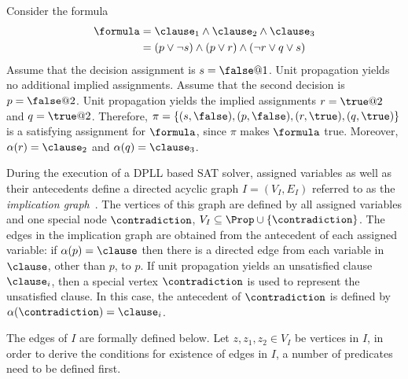 \begin{example}
    Consider the formula 
    \begin{align*}
        \formula & = \clause_1 \land \clause_2 \land \clause_3\\
                 & = (p \lor \neg s) \land (p \lor r) \land (\neg r \lor q \lor s)
    \end{align*}
    Assume that the decision assignment is $s = \false @ 1$. Unit propagation
    yields no additional implied assignments. Assume that the second decision is
    $p = \false @ 2$. Unit propagation yields the implied assignments $r = \true
    @ 2$ and $q = \true @ 2$. Therefore, $\pi = \{(s, \false), (p, \false), (r,
    \true), (q, \true)\}$ is a satisfying assignment for $\formula$, since $\pi$
    makes $\formula$ true. Moreover, $\alpha(r) = \clause_2$ and $\alpha(q) =
    \clause_3$.
\end{example}

During the execution of a DPLL based SAT solver, assigned variables as well as
their antecedents define a directed acyclic graph $I = (V_I, E_I)$ referred to as
the \emph{implication graph}~\cite{silva1997grasp}. The vertices of this graph
are defined by all assigned variables and one special node $\contradiction$, $V_I
\subseteq \Prop \cup \{\contradiction\}$. The edges in the implication graph are
obtained from the antecedent of each assigned variable: if $\alpha(p) = \clause$
then there is a directed edge from each variable in $\clause$, other than $p$, to
$p$. If unit propagation yields an unsatisfied clause $\clause_i$, then a special
vertex $\contradiction$ is used to represent the unsatisfied clause. In this case, the
antecedent of $\contradiction$ is defined by $\alpha(\contradiction) = \clause_i$.

The edges of $I$ are formally defined below. Let $z, z_1, z_2 \in V_I$ be
vertices in $I$, in order to derive the conditions for existence of edges in
$I$, a number of predicates need to be defined first. 

